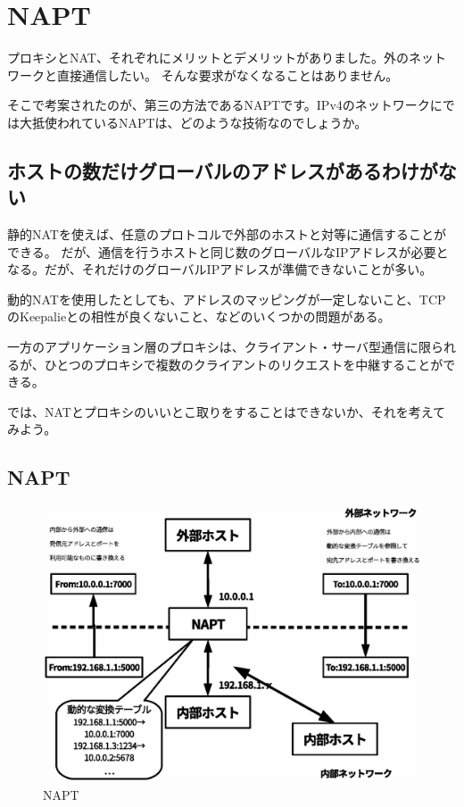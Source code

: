 \chapter{NAPT}

プロキシとNAT、それぞれにメリットとデメリットがありました。外のネットワークと直接通信したい。
そんな要求がなくなることはありません。

そこで考案されたのが、第三の方法であるNAPTです。IPv4のネットワークにでは大抵使われているNAPTは、どのような技術なのでしょうか。

\section{ホストの数だけグローバルのアドレスがあるわけがない}
静的NATを使えば、任意のプロトコルで外部のホストと対等に通信することができる。
だが、通信を行うホストと同じ数のグローバルなIPアドレスが必要となる。だが、それだけのグローバルIPアドレスが準備できないことが多い。

動的NATを使用したとしても、アドレスのマッピングが一定しないこと、TCPのKeepalieとの相性が良くないこと、などのいくつかの問題がある。

一方のアプリケーション層のプロキシは、クライアント・サーバ型通信に限られるが、ひとつのプロキシで複数のクライアントのリクエストを中継することができる。

では、NATとプロキシのいいとこ取りをすることはできないか、それを考えてみよう。


\section{NAPT}

\begin{figure}[htbp]
	\includegraphics[width=12cm,clip]{draw/fig9.eps}
	\caption{NAPT}
	\label{fig:NAPT}
\end{figure}

